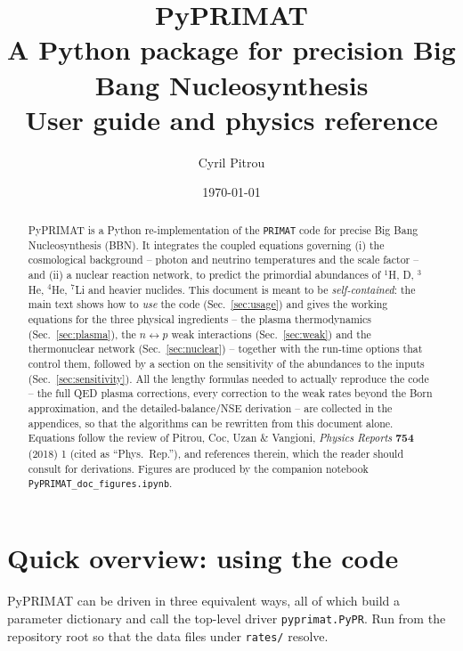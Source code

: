 \documentclass[11pt,a4paper]{article}
\title{\textbf{PyPRIMAT}\\[2pt]
       \large A Python package for precision Big Bang Nucleosynthesis\\[6pt]
       \normalsize User guide and physics reference}
\author{Cyril Pitrou}
\date{\today}
\newcommand{\code}[1]{\texttt{#1}}
\newcommand{\PR}{Phys.\ Rep.}
\begin{document}
\maketitle

\begin{abstract}
\noindent
PyPRIMAT is a Python re-implementation of the \code{PRIMAT} code for precise
Big Bang Nucleosynthesis (BBN). It integrates the coupled equations governing
(i) the cosmological background -- photon and neutrino temperatures and the
scale factor -- and (ii) a nuclear reaction network, to predict the primordial
abundances of $^{1}$H, D, $^{3}$He, $^{4}$He, $^{7}$Li and heavier nuclides.
This document is meant to be \emph{self-contained}: the main text shows how to
\emph{use} the code (Sec.~\ref{sec:usage}) and gives the working equations for
the three physical ingredients -- the plasma thermodynamics
(Sec.~\ref{sec:plasma}), the $n\leftrightarrow p$ weak interactions
(Sec.~\ref{sec:weak}) and the thermonuclear network (Sec.~\ref{sec:nuclear}) --
together with the run-time options that control them, followed by a section on
the sensitivity of the abundances to the inputs (Sec.~\ref{sec:sensitivity}).
All the lengthy formulas needed to actually reproduce the code -- the full QED
plasma corrections, every correction to the weak rates beyond the Born
approximation, and the detailed-balance/NSE derivation -- are collected in the
appendices, so that the algorithms can be rewritten from this document alone.
Equations follow the review of Pitrou, Coc, Uzan \& Vangioni,
\emph{Physics Reports} \textbf{754} (2018) 1 \cite{PhysRep2018} (cited as
``\PR''), and references therein, which the reader should consult for
derivations.  Figures are produced by the companion notebook
\code{PyPRIMAT\_doc\_figures.ipynb}.
\end{abstract}

\tableofcontents

\section{Quick overview: using the code}\label{sec:usage}

PyPRIMAT can be driven in three equivalent ways, all of which build a parameter
dictionary and call the top-level driver \code{pyprimat.PyPR}. Run from the
repository root so that the data files under \code{rates/} resolve.
\end{document}

